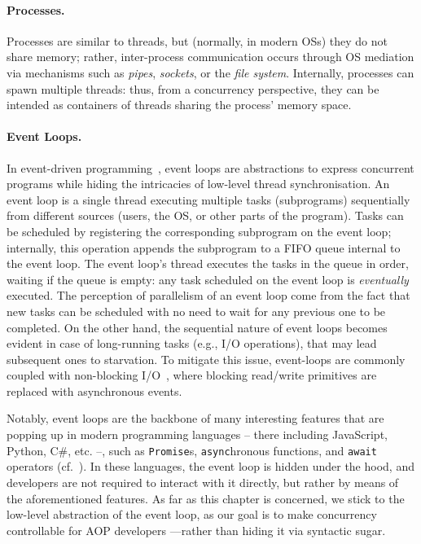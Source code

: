 \paragraph{Processes.}

Processes are similar to threads,
but (normally, in modern \acp{OS}) they do not share memory;
rather,
inter-process communication occurs through \ac{OS} mediation via mechanisms
such as \emph{pipes}, \emph{sockets}, or the \emph{file system}.
%
%
Internally, processes can spawn multiple threads:
thus, from a concurrency perspective,
they can be intended as containers of threads sharing the process' memory space.

\paragraph{Event Loops.}

In event-driven programming~\cite{DabekZKMM2002},
event loops are abstractions to express concurrent programs while hiding the intricacies of low-level thread synchronisation.
%
An event loop is a single thread executing multiple tasks (subprograms) sequentially from different sources
(users, the \ac{OS}, or other parts of the program).
%
Tasks can be scheduled by registering the corresponding subprogram on the event loop;
internally, this operation appends the subprogram to a \ac{FIFO} queue internal to the event loop.
%
The event loop's thread executes the tasks in the queue in order,
waiting if the queue is empty:
any task scheduled on the event loop is \emph{eventually} executed.
%
The perception of parallelism of an event loop come from the fact
that new tasks can be scheduled with no need to wait for any previous one to be completed.
%
On the other hand,
the sequential nature of event loops becomes evident in case of long-running tasks
(e.g., I/O operations),
that may lead subsequent ones to starvation.
%
To mitigate this issue,
event-loops are commonly coupled with non-blocking I/O~\cite{BuettnerKL09},
where blocking read/write primitives are replaced with asynchronous events.

Notably, 
event loops are the backbone of many interesting features that are popping up in modern programming languages
-- there including JavaScript, Python, C\#, etc. --,
such as \texttt{Promise}s, \texttt{async}hronous functions, and \texttt{await} operators (cf.~\cite{LoringML17}).
%
In these languages, 
the event loop is hidden under the hood,
and developers are not required to interact with it directly,
but rather by means of the aforementioned features.
%
As far as this chapter is concerned, 
we stick to the low-level abstraction of the event loop,
as our goal is to make concurrency controllable for \ac{AOP} developers%
---rather than hiding it via syntactic sugar.

